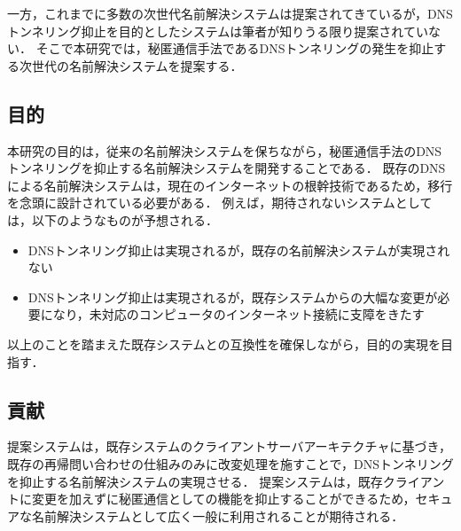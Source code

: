 一方，これまでに多数の次世代名前解決システムは提案されてきているが，DNSトンネリング抑止を目的としたシステムは筆者が知りうる限り提案されていない．
そこで本研究では，秘匿通信手法であるDNSトンネリングの発生を抑止する次世代の名前解決システムを提案する．


\subsection{目的}
本研究の目的は，従来の名前解決システムを保ちながら，秘匿通信手法のDNSトンネリングを抑止する名前解決システムを開発することである．
既存のDNSによる名前解決システムは，現在のインターネットの根幹技術であるため，移行を念頭に設計されている必要がある．
例えば，期待されないシステムとしては，以下のようなものが予想される．
\begin{itemize}
 \setlength{\itemsep}{-0.5mm}
 \item DNSトンネリング抑止は実現されるが，既存の名前解決システムが実現されない
 \item DNSトンネリング抑止は実現されるが，既存システムからの大幅な変更が必要になり，未対応のコンピュータのインターネット接続に支障をきたす
\end{itemize}
以上のことを踏まえた既存システムとの互換性を確保しながら，目的の実現を目指す．

\subsection{貢献}
提案システムは，既存システムのクライアントサーバアーキテクチャに基づき，既存の再帰問い合わせの仕組みのみに改変処理を施すことで，DNSトンネリングを抑止する名前解決システムの実現させる．
提案システムは，既存クライアントに変更を加えずに秘匿通信としての機能を抑止することができるため，セキュアな名前解決システムとして広く一般に利用されることが期待される．

